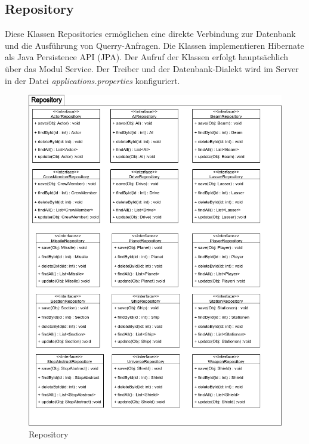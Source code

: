\documentclass[fontsize=12pt,paper=a4,twoside]{scrartcl}
\begin{document}
\subsection{Repository}
Diese Klassen Repositories ermöglichen eine direkte Verbindung zur Datenbank und die Ausführung von Querry-Anfragen. Die Klassen implementieren Hibernate als Java Persistence API (JPA). Der Aufruf der Klassen erfolgt hauptsächlich über das Modul Service. Der Treiber und der Datenbank-Dialekt wird im Server in der Datei \emph{applications.properties} konfiguriert.
\begin{figure}[htp]
	\centering
	\includegraphics[width=0.9\linewidth]{pics/Repository_Komponente.png}
	\caption{Repository}
	\label{fig3}
	
\end{figure}

\newpage
\end{document}
